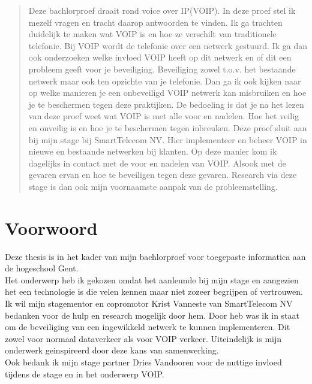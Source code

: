 \documentclass[pdftex,a4paper,12pt,twoside]{report}
\begin{document}
\begin{abstract}

Deze bachlorproef draait rond voice over IP(VOIP). In deze proef stel ik mezelf vragen en tracht daarop antwoorden te vinden. Ik ga trachten duidelijk te maken wat VOIP is en hoe ze verschilt van traditionele telefonie. Bij VOIP wordt de telefonie over een netwerk gestuurd. Ik ga dan ook onderzoeken welke invloed VOIP heeft op dit netwerk en of dit een probleem geeft voor je beveiliging. Beveiliging zowel t.o.v. het bestaande netwerk maar ook ten opzichte van je telefonie. Dan ga ik ook kijken naar op welke manieren je een onbeveiligd VOIP netwerk kan misbruiken en hoe je te beschermen tegen deze praktijken. De bedoeling is dat je na het lezen van deze proef weet wat VOIP is met alle voor en nadelen. Hoe het veilig en onveilig is en hoe je te beschermen tegen inbreuken. Deze proef sluit aan bij mijn stage bij SmartTelecom NV. Hier implementeer en beheer VOIP in nieuwe en bestaande netwerken bij klanten. Op deze manier kom ik dagelijks in contact met de voor en nadelen van VOIP. Alsook met de gevaren ervan en hoe te beveiligen tegen deze gevaren. Research via deze stage is dan ook mijn voornaamste aanpak van de probleemstelling.
 
\end{abstract}

\chapter*{Voorwoord}
\label{ch:voorwoord}
Deze thesis is in het kader van mijn bachlorproef voor toegepaste informatica aan de hogeschool Gent.\\
Het onderwerp heb ik gekozen omdat het aanleunde bij mijn stage en aangezien het een technologie is die velen kennen maar niet zozeer begrijpen of vertrouwen. 
Ik wil mijn stagementor en copromotor Krist Vanneste van SmartTelecom NV bedanken voor de hulp en research mogelijk door hem. Door heb was ik in staat om de beveiliging van een ingewikkeld netwerk te kunnen implementeren. Dit zowel voor normaal dataverkeer als voor VOIP verkeer. Uiteindelijk is mijn onderwerk geinspireerd door deze kans van samenwerking.\\
Ook bedank ik mijn stage partner Dries Vandooren voor de nuttige invloed tijdens de stage en in het onderwerp VOIP.
\end{document}
